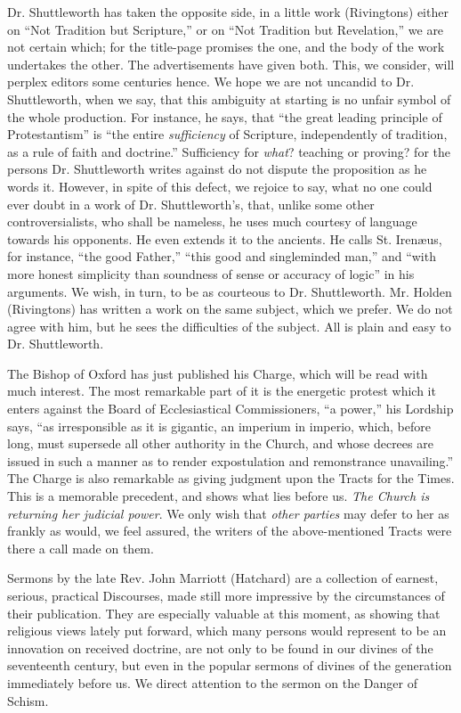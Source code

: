 Dr. Shuttleworth has taken the opposite side, in a
little work (Rivingtons) either on ``Not Tradition but Scripture,'' or on ``Not
Tradition but Revelation,'' we are not certain which; for the title-page
promises the one, and the body of the work undertakes the other. The
advertisements have given both. This, we consider, will perplex editors
some centuries hence. We hope we are not uncandid to Dr. Shuttleworth,
when we say, that this ambiguity at starting is no unfair symbol of the
whole production. For instance, he says, that ``the great leading
principle of Protestantism'' is ``the entire \emph{sufficiency} of
Scripture, independently of tradition, as a rule of faith and doctrine.''
Sufficiency for \emph{what}? teaching or proving? for the persons Dr.
Shuttleworth writes against do not dispute the proposition as he words
it. However, in spite of this defect, we rejoice to say, what no one
could ever doubt in a work of Dr. Shuttleworth's, that, unlike
some other controversialists, who shall be nameless, he uses much
courtesy of language towards his opponents. He even extends it to the
ancients. He calls St. Irenæus, for instance, ``the good Father,'' ``this
good and singleminded man,'' and ``with more honest simplicity than
soundness of sense or accuracy of logic'' in his arguments. We wish, in
turn, to be as courteous to Dr. Shuttleworth. Mr. Holden (Rivingtons)
has written a work on the same subject, which we prefer. We do not agree
with him, but he sees the difficulties of the subject. All is plain and
easy to Dr. Shuttleworth.

The Bishop of Oxford has just published his Charge,
which will be read with much interest. The most remarkable part of it is
the energetic protest which it enters against the Board of
Ecclesiastical Commissioners, ``a power,'' his Lordship says, ``as
irresponsible as it is gigantic, an imperium in imperio, which, before
long, must supersede all other authority in the Church, and whose
decrees are issued in such a manner as to render expostulation and
remonstrance unavailing.'' The Charge is also remarkable as giving
judgment upon the Tracts for the Times. This is a memorable precedent,
and shows what lies before us. \emph{The Church is returning her judicial
power}. We only wish that \emph{other parties} may defer to her as
frankly as would, we feel assured, the writers of the above-mentioned
Tracts were there a call made on them.

Sermons by the late Rev. John Marriott (Hatchard)
are a collection of earnest, serious, practical Discourses, made still
more impressive by the circumstances of their publication. They are
especially valuable at this moment, as showing that religious views
lately put forward, which many persons would represent to be an
innovation on received doctrine, are not only to be found in our divines
of the seventeenth century, but even in the popular sermons of divines
of the generation immediately before us. We direct attention to the
sermon on the Danger of Schism.

